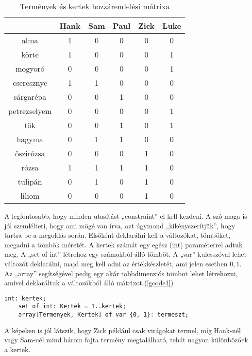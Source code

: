 \documentclass[12pt,a4paper]{report}
\begin{document}
	\begin{table}[ht!]
		\centering
		\caption{Termények és kertek hozzárendelési mátrixa}
        \label{termenymatrix}
		\begin{tabular}{|c|c|c|c|c|c|}
			\hline 
			& Hank & Sam & Paul & Zick & Luke \\ 
			\hline 
			alma & 1 & 0 & 0 & 0 & 0 \\ 
			\hline 
			körte & 1 & 0 & 0 & 0 & 1 \\ 
			\hline 
			mogyoró & 0 & 0 & 0 & 0 & 1 \\ 
			\hline 
			cseresznye & 1 & 1 & 0 & 0 & 0 \\ 
			\hline 
			sárgarépa & 0 & 0 & 1 & 0 & 0 \\ 
			\hline 
			petrezselyem & 0 & 0 & 0 & 0 & 1 \\ 
			\hline 
			tök & 0 & 0 & 1 & 0 & 1 \\ 
			\hline 
			hagyma & 0 & 1 & 1 & 0 & 0 \\ 
			\hline 
			őszirózsa & 0 & 0 & 0 & 1 & 0 \\ 
			\hline 
			rózsa & 1 & 1 & 1 & 1 & 0 \\ 
			\hline 
			tulipán & 0 & 1 & 0 & 1 & 0 \\ 
			\hline 
			liliom & 0 & 0 & 0 & 1 & 0 \\ 
			\hline 
		\end{tabular}
	\end{table}
     
    A legfontosabb, hogy minden utasítást „constraint”-el kell kezdeni.
    A szó maga is jól szemlélteti, hogy ami mögé van írva, azt úgymond „kikényszerítjük”, hogy tartsa be a megoldás során.
    Elsőként deklarálni kell a változókat, tömböket, megadni a tömbök méretét.
    A kertek számát egy egész (int) paraméterrel adtuk meg.
    A „set of int” létrehoz egy számokból álló tömböt.
    A „var” kulcsszóval lehet változót deklarálni, majd meg kell adni az értékkészletét, ami jelen esetben ${0,1}$.
    Az „array” segítségével pedig egy akár többdimenziós tömböt lehet létrehozni, amivel deklaráltuk a változókból álló mátrixot.(\ref{gcode1})

	\begin{lstlisting}[caption=Adatok létrehozása, label=gcode1]
	int: kertek;
	set of int: Kertek = 1..kertek;
	array[Termenyek, Kertek] of var {0, 1}: termeszt; \end{lstlisting}
	
    A képeken is jól látszik, hogy Zick például csak virágokat termel, míg Hank-nél vagy 
    Sam-nél mind három fajta termény megtalálható, tehát nagyon különbözőek a kertek.
\end{document}
